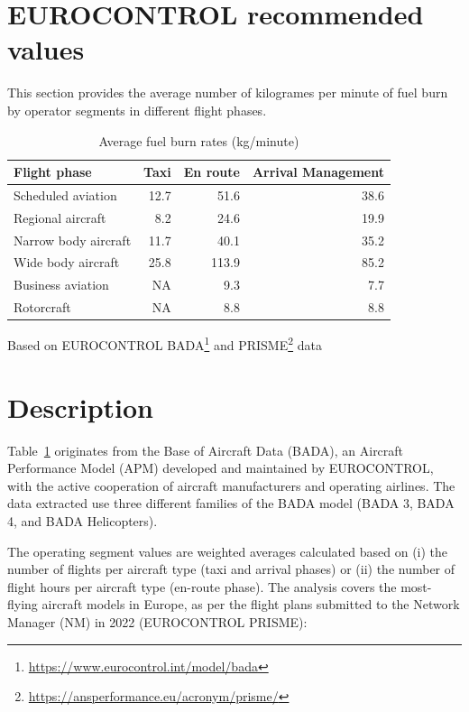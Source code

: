 \documentclass[
  11pt,
  a4paper,
]{book}
\DeclareRobustCommand{\href}[2]{#2\footnote{\url{#1}}}
\begin{document}
\hypertarget{eurocontrol-recommended-values-3}{%
\section{EUROCONTROL recommended
values}\label{eurocontrol-recommended-values-3}}

This section provides the average number of kilogrames per minute of
fuel burn by operator segments in different flight phases.

\hypertarget{tbl-rate-fuel-burn}{}
\setlength{\LTpost}{0mm}
\begin{longtable}{lrrr}
\caption{\label{tbl-rate-fuel-burn}Average fuel burn rates (kg/minute) }\tabularnewline

\toprule
Flight phase & Taxi & En route & Arrival Management \\ 
\midrule
Scheduled aviation & 12.7 & 51.6 & 38.6 \\ 
Regional aircraft & 8.2 & 24.6 & 19.9 \\ 
Narrow body aircraft & 11.7 & 40.1 & 35.2 \\ 
Wide body aircraft & 25.8 & 113.9 & 85.2 \\ 
Business aviation & NA & 9.3 & 7.7 \\ 
Rotorcraft & NA & 8.8 & 8.8 \\ 
\bottomrule
\end{longtable}
\begin{minipage}{\linewidth}
Based on EUROCONTROL \href{https://www.eurocontrol.int/model/bada}{BADA} and \href{https://ansperformance.eu/acronym/prisme/}{PRISME} data\\
\end{minipage}

\hypertarget{description-1}{%
\section{Description}\label{description-1}}

Table~\ref{tbl-rate-fuel-burn} originates from the Base of Aircraft Data
(BADA), an Aircraft Performance Model (APM) developed and maintained by
EUROCONTROL, with the active cooperation of aircraft manufacturers and
operating airlines. The data extracted use three different families of
the BADA model (BADA 3, BADA 4, and BADA Helicopters).

The operating segment values are weighted averages calculated based on
(i) the number of flights per aircraft type (taxi and arrival phases) or
(ii) the number of flight hours per aircraft type (en-route phase). The
analysis covers the most-flying aircraft models in Europe, as per the
flight plans submitted to the Network Manager (NM) in 2022 (EUROCONTROL
PRISME):
\end{document}
